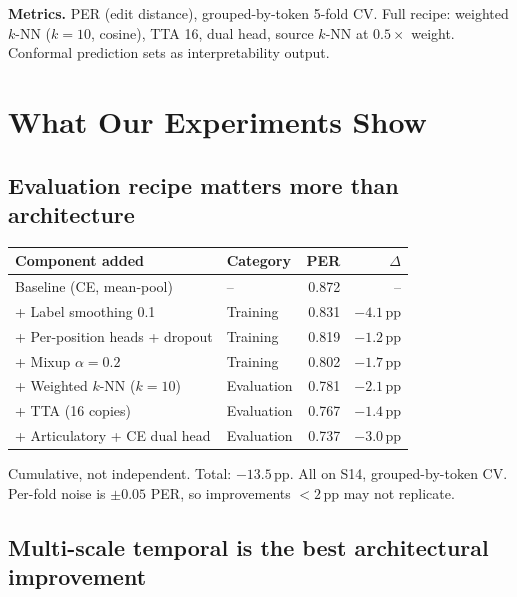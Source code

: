 \documentclass[11pt,letterpaper]{article}
\newcommand{\pp}{\,\text{pp}}
\begin{document}
\textbf{Metrics.} PER (edit distance), grouped-by-token 5-fold CV. Full recipe: weighted $k$-NN ($k{=}10$, cosine), TTA 16, dual head, source $k$-NN at $0.5\times$ weight. Conformal prediction sets as interpretability output.



\section{What Our Experiments Show}\label{sec:experiments}

\subsection{Evaluation recipe matters more than architecture}

\begin{table}[ht!]
\centering\small
\begin{tabular}{@{}llrr@{}}
\toprule
\textbf{Component added} & \textbf{Category} & \textbf{PER} & \textbf{$\Delta$} \\
\midrule
Baseline (CE, mean-pool) & -- & 0.872 & -- \\
+ Label smoothing 0.1 & Training & 0.831 & $-4.1\pp$ \\
+ Per-position heads + dropout & Training & 0.819 & $-1.2\pp$ \\
+ Mixup $\alpha{=}0.2$ & Training & 0.802 & $-1.7\pp$ \\
+ Weighted $k$-NN ($k{=}10$) & Evaluation & 0.781 & $-2.1\pp$ \\
+ TTA (16 copies) & Evaluation & 0.767 & $-1.4\pp$ \\
+ Articulatory + CE dual head & Evaluation & 0.737 & $-3.0\pp$ \\
\bottomrule
\end{tabular}
\end{table}

Cumulative, not independent. Total: $-13.5\pp$. All on S14, grouped-by-token CV. Per-fold noise is $\pm 0.05$ PER, so improvements $< 2\pp$ may not replicate.

\subsection{Multi-scale temporal is the best architectural improvement}
\end{document}
